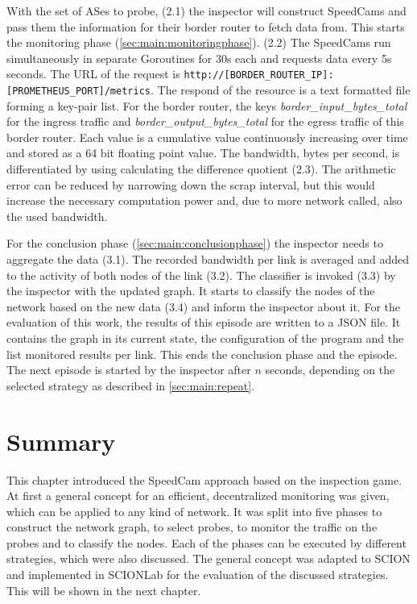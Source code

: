 \documentclass[thesis.tex]{subfiles}
\begin{document}
With the set of ASes to probe, (2.1) the inspector will construct SpeedCams and pass them the information for their border router to fetch data from. This starts the monitoring phase (\autoref{sec:main:monitoringphase}). (2.2) The SpeedCams run simultaneously in separate Goroutines for 30s each and requests data every 5s seconds. The URL of the request is \lstinline|http://[BORDER_ROUTER_IP]:[PROMETHEUS_PORT]/metrics|. The respond of the resource is a text formatted file forming a key-pair list. For the border router, the keys \textit{border\_input\_bytes\_total} for the ingress traffic and \textit{border\_output\_bytes\_total} for the egress traffic of this border router. Each value is a cumulative value continuously increasing over time and stored as a 64 bit floating point value. The bandwidth, bytes per second, is differentiated by using calculating the difference quotient (2.3). The arithmetic error can be reduced by narrowing down the scrap interval, but this would increase the necessary computation power and, due to more network called, also the used bandwidth.

For the conclusion phase (\autoref{sec:main:conclusionphase}) the inspector needs to aggregate the data (3.1). The recorded bandwidth per link is averaged and added to the activity of both nodes of the link (3.2). The classifier is invoked (3.3) by the inspector with the updated graph. It starts to classify the nodes of the network based on the new data (3.4) and inform the inspector about it. For the evaluation of this work, the results of this episode are written to a JSON file. It contains the graph in its current state, the configuration of the program and the list monitored results per link. This ends the conclusion phase and the episode. The next episode is started by the inspector after  $n$ seconds, depending on the selected strategy as described in \autoref{sec:main:repeat}.

\section{Summary}
This chapter introduced the SpeedCam approach based on the inspection game. At first a general concept for an efficient, decentralized monitoring was given, which can be applied to any kind of network. It was split into five phases to construct the network graph, to select probes, to monitor the traffic on the probes and to classify the nodes. Each of the phases can be executed by different strategies, which were also discussed. The general concept was adapted to SCION and implemented in SCIONLab for the evaluation of the discussed strategies. This will be shown in the next chapter.
\subfilebib %
\end{document}
